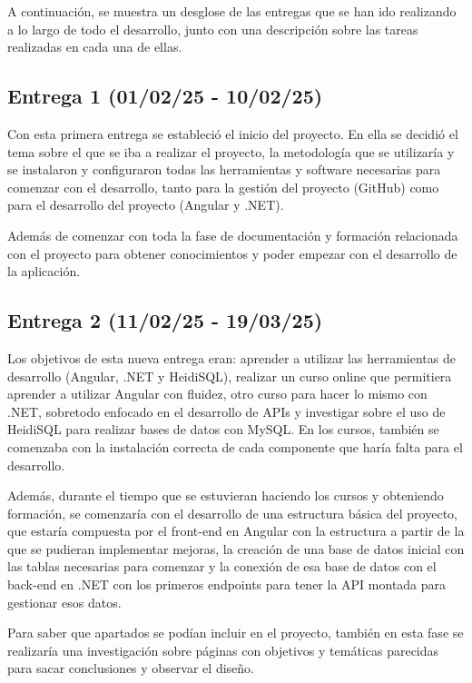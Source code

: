 A continuación, se muestra un desglose de las entregas que se han ido realizando a lo largo de todo el desarrollo, junto con una descripción sobre las tareas realizadas en cada una de ellas.

\subsection{Entrega 1 (01/02/25 - 10/02/25)}

Con esta primera entrega se estableció el inicio del proyecto. En ella se decidió el tema sobre el que se iba a realizar el proyecto, la metodología que se utilizaría y se instalaron y configuraron todas las herramientas y software necesarias para comenzar con el desarrollo, tanto para la gestión del proyecto (GitHub) como para el desarrollo del proyecto (Angular y .NET).

Además de comenzar con toda la fase de documentación y formación relacionada con el proyecto para obtener conocimientos y poder empezar con el desarrollo de la aplicación.

\subsection{Entrega 2 (11/02/25 - 19/03/25)}

Los objetivos de esta nueva entrega eran: aprender a utilizar las herramientas de desarrollo (Angular, .NET y HeidiSQL), realizar un curso online que permitiera aprender a utilizar Angular con fluidez, otro curso para hacer lo mismo con .NET, sobretodo enfocado en el desarrollo de APIs y investigar sobre el uso de HeidiSQL para realizar bases de datos con MySQL. En los cursos, también se comenzaba con la instalación correcta de cada componente que haría falta para el desarrollo.

Además, durante el tiempo que se estuvieran haciendo los cursos y obteniendo formación, se comenzaría con el desarrollo de una estructura básica del proyecto, que estaría compuesta por el front-end en Angular con la estructura a partir de la que se pudieran implementar mejoras, la creación de una base de datos inicial con las tablas necesarias para comenzar y la conexión de esa base de datos con el back-end en .NET con los primeros endpoints para tener la API montada para gestionar esos datos.

Para saber que apartados se podían incluir en el proyecto, también en esta fase se realizaría una investigación sobre páginas con objetivos y temáticas parecidas para sacar conclusiones y observar el diseño.

